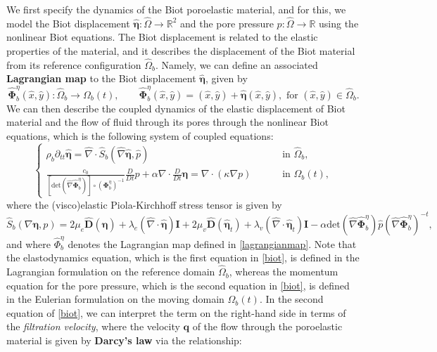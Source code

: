 \documentclass[11pt]{article}
\newcommand{\bd}{\boldsymbol}
\def\R{{\mathbb R}}
\theoremstyle{definition}
\begin{document}
We first specify the dynamics of the Biot poroelastic material, and for this, we model the Biot displacement $\hat{\bd{\eta}}: \hat{\Omega} \to \R^{2}$ and the pore pressure $p: \hat{\Omega} \to \R$ using the nonlinear Biot equations. The Biot displacement is related to the elastic properties of the material, and it describes the displacement of the Biot material from its reference configuration $\hat{\Omega}_{b}$. Namely, we can define an associated \textbf{Lagrangian map} to the Biot displacement $\hat{\bd{\eta}}$, given by
\begin{equation}\label{lagrangianmap}
\hat{\bd{\Phi}}_{b}^{\eta}(\hat{x}, \hat{y}): \hat{\Omega}_{b} \to \Omega_{b}(t), \qquad \hat{\bd{\Phi}}^{\eta}_{b}(\hat{x}, \hat{y}) = (\hat{x}, \hat{y}) + \hat{\bd{\eta}}(\hat{x}, \hat{y}), \text{ for } (\hat{x}, \hat{y}) \in \hat{\Omega}_{b}.
\end{equation}
We can then describe the coupled dynamics of the elastic displacement of Biot material and the flow of fluid through its pores through the nonlinear Biot equations, which is the following system of coupled equations:
\begin{equation}\label{biot}
\begin{cases} 
\rho_{b}\partial_{tt}\hat{\bd{\eta}} = \hat{\nabla} \cdot \hat{S}_{b}(\hat{\nabla}\hat{\bd{\eta}}, \hat{p}) \qquad &\text{ in } \hat{\Omega}_{b}, \\
\displaystyle \frac{c_{0}}{[\text{det}(\hat{\nabla} \hat{\bd{\Phi}}^{\eta}_{b})] \circ (\bd{\Phi}^{\eta}_{b})^{-1}} \frac{D}{Dt} p + \alpha \nabla \cdot \frac{D}{Dt} \bd{\eta} = \nabla \cdot (\kappa \nabla p) \qquad &\text{ in } \Omega_{b}(t),
\end{cases}
\end{equation}
where the (visco)elastic Piola-Kirchhoff stress tensor is given by
\begin{equation}\label{kirchhoff}
\hat{S}_{b}(\nabla \bd{\eta}, p) = 2\mu_{e} \hat{\bd{D}}(\hat{\bd{\eta}}) + \lambda_{e} (\hat{\nabla} \cdot \hat{\bd{\eta}}) \bd{I} + 2\mu_{v} \hat{\bd{D}}(\hat{\bd{\eta}}_{t}) + \lambda_{v} (\hat{\nabla} \cdot \hat{\bd{\eta}}_{t}) \bd{I} - \alpha \text{det}(\hat{\nabla} \hat{\bd{\Phi}}^{\eta}_{b}) \hat{p} (\hat{\nabla} \hat{\bd{\Phi}}^{\eta}_{b})^{-t},
\end{equation}
and where $\hat{\Phi}^{\eta}_{b}$ denotes the Lagrangian map defined in \eqref{lagrangianmap}. Note that the elastodynamics equation, which is the first equation in \eqref{biot}, is defined in the Lagrangian formulation on the reference domain $\hat{\Omega}_{b}$, whereas the momentum equation for the pore pressure, which is the second equation in \eqref{biot}, is defined in the Eulerian formulation on the moving domain $\Omega_{b}(t)$. In the second equation of \eqref{biot}, we can interpret the term on the right-hand side in terms of the \textit{filtration velocity}, where the velocity $\bd{q}$ of the flow through the poroelastic material is given by \textbf{Darcy's law} via the relationship:
\end{document}
